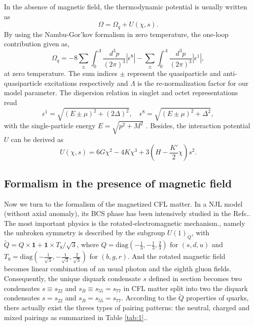 \documentclass[prd, showpacs,nofootinbib,amsmath,amssymb,12pt]{revtex4}
\begin{document}
In the absence of magnetic field, the thermodynamic potential is usually written as 
\begin{equation}
\Omega=\Omega_q+U(\chi,s).
\end{equation}
By using the Nambu-Gor'kov formalism in zero temperature, 
the one-loop contribution given as\cite{abuki2010nambu},
\begin{equation}
\Omega_q=-8\sum_{\pm}\int^{\Lambda}_0\frac{d^3p}{(2\pi)^3}|\epsilon^8|
-\sum_{\pm}\int^{\Lambda}_0\frac{d^3p}{(2\pi)^3}|\epsilon^1|,
\label{oneloopinzero}
\end{equation}
at zero temperature. The sum indices  $\pm$ represent the quasiparticle and anti-quasiparticle excitations respectively and  $\Lambda$ is the re-normalization factor for our model parameter.
The dispersion relation in singlet and octet representations read
\begin{equation}
\epsilon^1=\sqrt{(E\pm\mu)^2+(2\Delta)^2},\quad
\epsilon^8=\sqrt{(E\pm\mu)^2+\Delta^2},
\label{despersionzerofield}
\end{equation}
with the single-particle energy $E=\sqrt{p^2+M^2}$ .
Besides, the interaction potential $U$ can be derived as
\begin{equation}
U(\chi,s) = 6G\chi^2 - 4K\chi^3 + 3(H-\frac{K'}{2}\chi)s^2.
\label{potentialterm}
\end{equation}

\subsection{Formalism in the presence of magnetic field}
Now we turn to the formalism of the magnetized CFL matter. 
In a NJL model (without axial anomaly), 
its BCS phase has been intensively studied in the Refs.\cite{ferrer2005magnetic,Fukushima2008Color,Ferrer2006Color}.
The most important physics is the rotated-electromagnetic mechanism.\cite{alford1998qcd},
namely the unbroken symmetry is described by the subgroup $U(1)_{\widetilde{Q}}$,
with $\widetilde{Q}=Q\times\bm{1}+\bm{1}\times T_8/\sqrt{3}$, 
where $Q=\text{diag}(-\frac{1}{3},-\frac{1}{3},\frac{2}{3})$ for $(s,d,u)$ and $T_8=\text{diag}(-\frac{1}{\sqrt{3}},-\frac{1}{\sqrt{3}},\frac{2}{\sqrt{3}})$ for $(b,g,r)$.
And the rotated magnetic field becomes linear combination of an usual photon and the eighth gluon fields.
Consequently, the unique diquark condensate $s$ defined in section becomes two condensates $s\equiv s_{22}$ and $s_B\equiv s_{55}=s_{77}$
in CFL matter split into two the diquark condensates $s=s_{22}$ and $s_B=s_{55}=s_{77}$.
According to the $\widetilde{Q}$ properties of quarks, there actually exist the threes types of pairing patterns:
the neutral, charged and mixed pairings as summarized in Table \ref{tab:1}.\cite{ferrer2005magnetic}.
\end{document}
